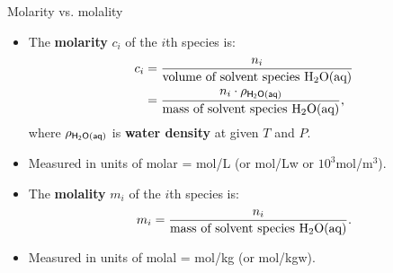 %
\begin{frame}{Molarity vs. molality}
%
\lcol
\vskip 20pt
\begin{itemize}
\item The \textbf{molarity} $c_{i}$ of the $i$th species is:
\begin{alignat*}{2}
c_{i} & = \frac{n_{i}}{\text{volume of solvent species H\ensuremath{_{2}}O(aq)}} \\
	& = \frac{n_{i} \cdot \rho_{\sf H{_{2}}O(aq)}}{\text{mass of solvent species H\ensuremath{_{2}}O(aq)}},
\end{alignat*}
where $\rho_{\sf H{_{2}}O(aq)}$ is \textbf{water density} at given $T$ and $P$.
\item Measured in units of \alert{molar} = mol/L (or mol/Lw or  $10^3$mol/m$^3$). 
\end{itemize}
\rcol
\begin{itemize}
\item The \textbf{molality} $m_{i}$ of the $i$th species is:
\[
m_{i}=\frac{n_{i}}{\text{mass of solvent species H\ensuremath{_{2}}O(aq)}}.
\]
\item Measured in units of \alert{molal} = mol/kg (or mol/kgw). 
\end{itemize}
\ecol
\end{frame}
%
%

